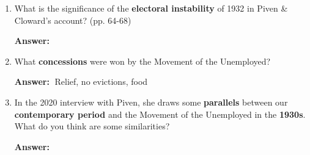 \documentclass{article}
\newcommand{\answer}{\textbf{Answer:}$\;$}
\begin{document}
\begin{enumerate}[label=\arabic*)]
\begin{enumerate}
    \end{enumerate}
    
    \item What is the significance of the \textbf{electoral instability} of 1932 in Piven \& Cloward's account? (pp. 64-68)

    \answer

    \item What \textbf{concessions} were won by the Movement of the Unemployed?

    \answer
    Relief,
    no evictions, 
    food
    

    \item In the 2020 interview with Piven, she draws some \textbf{parallels} between our \textbf{contemporary period} and the Movement of the Unemployed in the \textbf{1930s}.
    What do you think are some similarities?

    \answer
    
\end{enumerate}
 
\end{document}

